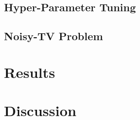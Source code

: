 \documentclass[draft,final]{vutinfth} %
\begin{document}
    \section{Hyper-Parameter Tuning}


    \section{Noisy-TV Problem}
    \citep{schmidhuber_formal_2010}

    \glsresetall


    \chapter{Results}


    \glsresetall


    \chapter{Discussion}

    \backmatter
    \listoffigures %

    \cleardoublepage %
    \listoftables %

    \listofalgorithms

    \printindex


    
    

\end{document}
